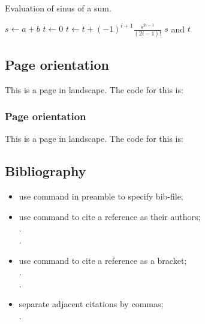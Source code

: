 \documentclass[report,english]{enacom}
\begin{document}
	\begin{algorithm}
		\caption{Evaluation of sinus of a sum.}
		\label{alg.Sinus}
			\begin{algorithmic}[1]
			\State $s \gets a + b$ 
			\State $t \gets 0$
				\State $t \gets t + (-1)^{i+1}\frac{s^{2i-1}}{(2i-1)!}$ 
			\EndFor
			\State \Return $s$ and $t$
		\end{algorithmic}
	\end{algorithm}


\begin{landscape}
    \subsection{Page orientation}
        This is a page in landscape. The code for this is:
        \begin{lcode}
        \begin{landscape}
            \subsubsection{Page orientation}
            This is a page in landscape. The code for this is:
        \end{landscape}
        \end{lcode}
\end{landscape}


\subsection{Bibliography}
	\begin{itemize}
		\item use command  in preamble to specify bib-file;	
        \item use command  to cite a reference as their authors;\\	
        \cite{Article}.\\
        \cite{Book}.
        \item use command  to cite a reference as a bracket;\\
        \citep{Article}.\\
        \citep{Book}.
        \item separate adjacent citations by commas;\\
        \citep{Article,Book}.
	\end{itemize}
\end{document}
